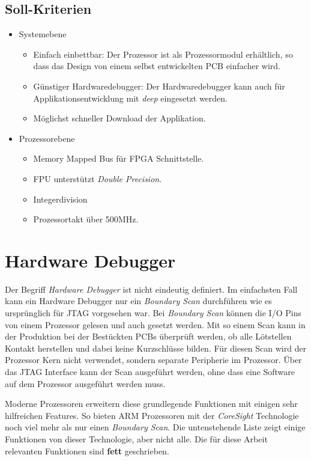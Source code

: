 \subsection{Soll-Kriterien}
\begin{itemize}
\item Systemebene
	\begin{itemize}
	\item Einfach einbettbar: Der Prozessor ist als Prozessormodul erhältlich, so dass das Design von einem selbst entwickelten PCB einfacher wird.
	\item Günstiger Hardwaredebugger: Der Hardwaredebugger kann auch für Applikationsentwicklung mit \textit{deep} eingesetzt werden.
	\item Möglichst schneller Download der Applikation.
	\end{itemize}
\item Prozessorebene
	\begin{itemize}
	\item Memory Mapped Bus für FPGA Schnittstelle.
	\item FPU unterstützt \textit{Double Precision}.
	\item Integerdivision
	\item Prozessortakt über 500MHz.
	\end{itemize}
\end{itemize}


\section{Hardware Debugger}
Der Begriff \textit{Hardware Debugger} ist nicht eindeutig definiert.
Im einfachsten Fall kann ein Hardware Debugger nur ein \textit{Boundary Scan} durchführen wie es ursprünglich für JTAG vorgesehen war.
Bei \textit{Boundary Scan} können die I/O Pins von einem Prozessor gelesen und auch gesetzt werden.
Mit so einem Scan kann in der Produktion bei der Bestückten PCBs überprüft werden, ob alle Lötstellen Kontakt herstellen und dabei keine Kurzschlüsse bilden.
Für diesen Scan wird der Prozessor Kern nicht verwendet, sondern separate Peripherie im Prozessor.
Über das JTAG Interface kann der Scan ausgeführt werden, ohne dass eine Software auf dem Prozessor ausgeführt werden muss.

Moderne Prozessoren erweitern diese grundlegende Funktionen mit einigen sehr hilfreichen Features.
So bieten ARM Prozessoren mit der \textit{CoreSight} Technologie noch viel mehr als nur einen \textit{Boundary Scan}.
Die untenstehende Liste zeigt einige Funktionen von dieser Technologie, aber nicht alle.
Die für diese Arbeit relevanten Funktionen sind \textbf{fett} geschrieben.

